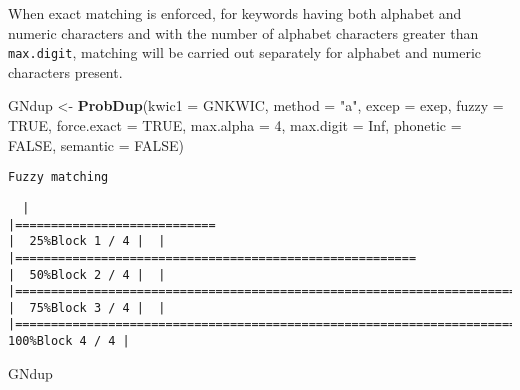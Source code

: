 \documentclass[
]{article}
\newenvironment{Shaded}{\begin{snugshade}}{\end{snugshade}}
\newcommand{\DataTypeTok}[1]{\textcolor[rgb]{0.13,0.29,0.53}{#1}}
\newcommand{\DecValTok}[1]{\textcolor[rgb]{0.00,0.00,0.81}{#1}}
\newcommand{\KeywordTok}[1]{\textcolor[rgb]{0.13,0.29,0.53}{\textbf{#1}}}
\newcommand{\NormalTok}[1]{#1}
\newcommand{\OtherTok}[1]{\textcolor[rgb]{0.56,0.35,0.01}{#1}}
\newcommand{\StringTok}[1]{\textcolor[rgb]{0.31,0.60,0.02}{#1}}
\begin{document}
When exact matching is enforced, for keywords having both alphabet and
numeric characters and with the number of alphabet characters greater
than \texttt{max.digit}, matching will be carried out separately for
alphabet and numeric characters present.

\begin{Shaded}
\begin{Highlighting}[]
\NormalTok{GNdup <-}\StringTok{ }\KeywordTok{ProbDup}\NormalTok{(}\DataTypeTok{kwic1 =}\NormalTok{ GNKWIC, }\DataTypeTok{method =} \StringTok{"a"}\NormalTok{, }\DataTypeTok{excep =}\NormalTok{ exep, }
                 \DataTypeTok{fuzzy =} \OtherTok{TRUE}\NormalTok{, }\DataTypeTok{force.exact =} \OtherTok{TRUE}\NormalTok{, }\DataTypeTok{max.alpha =} \DecValTok{4}\NormalTok{, }\DataTypeTok{max.digit =} \OtherTok{Inf}\NormalTok{,}
                 \DataTypeTok{phonetic =} \OtherTok{FALSE}\NormalTok{, }\DataTypeTok{semantic =} \OtherTok{FALSE}\NormalTok{)}
\end{Highlighting}
\end{Shaded}

\begin{verbatim}
Fuzzy matching
\end{verbatim}

\begin{verbatim}
  |                                                                                                                       |============================                                                                                   |  25%Block 1 / 4 |  |                                                                                                                       |========================================================                                                       |  50%Block 2 / 4 |  |                                                                                                                       |===================================================================================                            |  75%Block 3 / 4 |  |                                                                                                                       |===============================================================================================================| 100%Block 4 / 4 |
\end{verbatim}

\begin{Shaded}
\begin{Highlighting}[]
\NormalTok{GNdup}
\end{Highlighting}
\end{Shaded}
\end{document}
